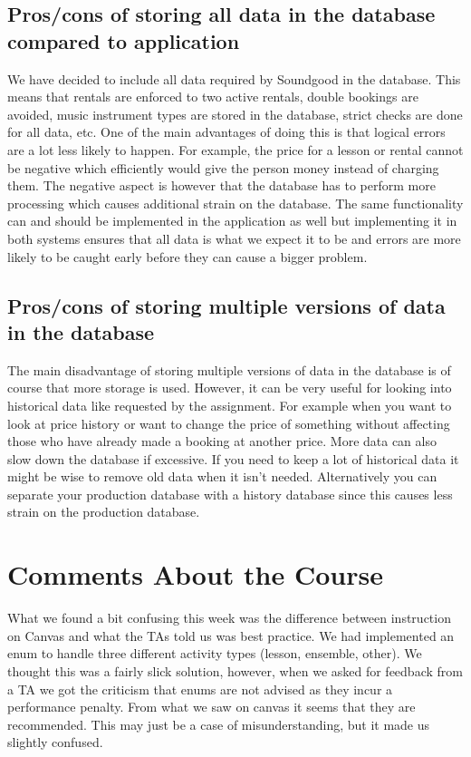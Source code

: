 \documentclass[a4paper]{scrartcl}
\begin{document}
\subsection{Pros/cons of storing all data in the database compared to application}
We have decided to include all data required by Soundgood in the database. This means that rentals are enforced to two active rentals, double bookings are avoided, music instrument types are stored in the database, strict checks are done for all data, etc. One of the main advantages of doing this is that logical errors are a lot less likely to happen. For example, the price for a lesson or rental cannot be negative which efficiently would give the person money instead of charging them. The negative aspect is however that the database has to perform more processing which causes additional strain on the database. The same functionality can and should be implemented in the application as well but implementing it in both systems ensures that all data is what we expect it to be and errors are more likely to be caught early before they can cause a bigger problem.

\subsection{Pros/cons of storing multiple versions of data in the database}
The main disadvantage of storing multiple versions of data in the database is of course that more storage is used. However, it can be very useful for looking into historical data like requested by the assignment. For example when you want to look at price history or want to change the price of something without affecting those who have already made a booking at another price. More data can also slow down the database if excessive. If you need to keep a lot of historical data it might be wise to remove old data when it isn't needed. Alternatively you can separate your production database with a history database since this causes less strain on the production database.

\section{Comments About the Course}

What we found a bit confusing this week was the difference between instruction on Canvas and what the TAs told us was best practice. We had implemented an enum to handle three different activity types (lesson, ensemble, other). We thought this was a fairly slick solution, however, when we asked for feedback from a TA we got the criticism that enums are not advised as they incur a performance penalty. From what we saw on canvas it seems that they are recommended. This may just be a case of misunderstanding, but it made us slightly confused.
\end{document}
